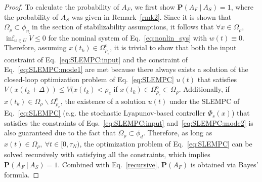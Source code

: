 \documentclass[letterpaper, 10pt, conference]{ieeeconf}
\begin{document}
\begin{proof}
To calculate the probability of $A_F$, we first show $\mathbf{P}(A_F~|~A_S)=1$, where the probability of $A_S$ was given in Remark~\ref{rmk2}. Since it is shown that $\Omega_{\rho} \subset \phi_n$ in the section of stabilizability assumptions, it follows that $\forall x \in \Omega_{\rho}$, $\inf_{ u \in U } \dot{V} \leq 0$ for the nominal system of Eq.~\ref{eq:nonlin_sys} with $w(t) \equiv 0$. Therefore, assuming $x(t_k) \in \Omega_{\rho_e}^\text{o}$, it is trivial to show that both the input constraint of Eq.~\ref{eq:SLEMPC:input} and the constraint of Eq.~\ref{eq:SLEMPC:mode1} are met because there always exists a solution of the closed-loop optimization problem of Eq.~\ref{eq:SLEMPC} $u(t)$ that satisfies $V(x(t_k+\Delta)) \leq V(x(t_k) < \rho_e$ if $x(t_k) \in \Omega_{\rho_e}^\text{o} \subset \Omega_{\rho}$. Additionally, if  $x(t_k) \in \Omega_{\rho} \backslash \Omega_{\rho_e}^\text{o}$, the existence of a solution $u(t)$ under the SLEMPC of Eq.~\ref{eq:SLEMPC} (e.g. the stochastic Lyapunov-based controller $\Phi_s(x)$) that satisfies the constraints of Eqs.~\ref{eq:SLEMPC:input} and~\ref{eq:SLEMPC:mode2} is also guaranteed due to the fact that $\Omega_{\rho} \subset \phi_d$. Therefore, as long as $x(t) \in \Omega_{\rho},~\forall t \in [0,\tau_{N})$, the optimization problem of Eq.~\ref{eq:SLEMPC} can be solved recursively with satisfying all the constraints, which implies $\mathbf{P}(A_F~|~A_S)=1$. Combined with Eq.~\ref{recursive}, $\mathbf{P}(A_F)$ is obtained via Bayes' formula.%
\end{proof}

\end{document}
